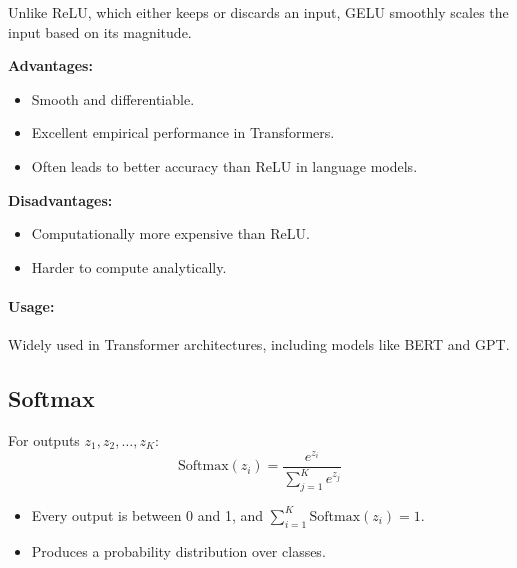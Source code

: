 \geluplot

Unlike ReLU, which either keeps or discards an input, GELU smoothly scales the input based on its magnitude.

\begin{advbox}
\textbf{Advantages:}
\begin{itemize}
    \item Smooth and differentiable.
    \item Excellent empirical performance in Transformers.
    \item Often leads to better accuracy than ReLU in language models.
\end{itemize}

\tcbline

\textbf{Disadvantages:}
\begin{itemize}
    \item Computationally more expensive than ReLU.
    \item Harder to compute analytically.
\end{itemize}
\end{advbox}

\paragraph{Usage:} Widely used in Transformer architectures, including models like BERT and GPT.

\subsection{Softmax}

For outputs $z_1, z_2, \dots, z_K$:
\begin{equation}
\text{Softmax}(z_i) = \frac{e^{z_i}}{\sum_{j=1}^{K} e^{z_j}}
\end{equation}

\softmaxplot

\begin{propertybox}
\begin{itemize}
    \item Every output is between 0 and 1, and $\sum_{i=1}^K \text{Softmax}(z_i) = 1$.
    \item Produces a probability distribution over classes.
\end{itemize}
\end{propertybox}

